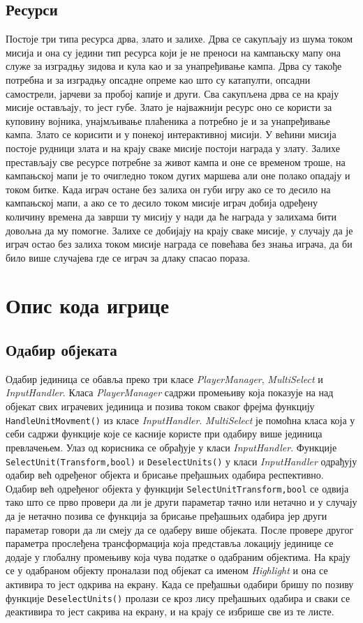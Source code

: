 \documentclass[11pt,a4paper]{report}
\begin{document}
\section{Ресурси}
Постоје три типа ресурса дрва, злато и залихе. Дрва се сакупљају из шума током мисија и она су једини тип ресурса који је не преноси на кампањску мапу она служе за изградњу зидова и кула као и за унапређивање кампа. Дрва су такође потребна и за изградњу опсадне опреме као што су катапулти, опсадни самострели, јарчеви за пробој капије и други. Сва сакупљена дрва се на крају мисије остављају, то јест губе. Злато је најважнији ресурс оно се користи за куповину војника, унајмљивање плаћеника а потребно је и за унапређивање кампа. Злато се корисити и у понекој интерактивној мисији. У већини мисија постоје рудници злата и на крају сваке мисије постоји награда у злату. Залихе престављају све ресурсе потребне за живот кампа и оне се временом троше, на кампањској мапи је то очигледно током дугих маршева али оне полако опадају и током битке. Када играч остане без залиха он губи игру ако се то десило на кампањској мапи, а ако се то десило током мисије играч добија одређену количину времена да заврши ту мисију у нади да ће награда у залихама бити довољна да му помогне. Залихе се добијају на крају сваке мисије, у случају да је играч остао без залиха током мисије награда се повећава без знања играча, да би било више случајева где се играч за длаку спасао пораза.

\chapter{Опис кода игрице}

\section{Одабир објеката}
Одабир јединица се обавља преко три класе \emph{PlayerManager}, \emph{MultiSelect} и \emph{InputHandler}. Класа \emph{PlayerManager} садржи промењиву која показује на над објекат свих играчевих јединица и позива током сваког фрејма  функцију \texttt{HandleUnitMovment()} из класе \emph{InputHandler}. \emph{MultiSelect} је помоћна класа која у себи садржи функције које се касније користе при одабиру више јединица превлачењем. Улаз од корисника се обрађује у класи \emph{InputHandler}. Функције \texttt{SelectUnit(Transform,bool)} и \texttt{DeselectUnits()} у класи \emph{InputHandler} одрађују одабир већ одређеног објекта и брисање пређашњих одабира респективно. Одабир већ одређеног објекта у функцији \texttt{SelectUnit{Transform,bool}} се одвија тако што се прво провери да ли је други параметар тачно или нетачно и у случају да је нетачно позива се функција за брисање пређашњих одабира јер други параметар говори да ли смеју да се одаберу више објеката. После провере другог параметра прослеђена трансформација која представља локацију јединице се додаје у глобалну промењиву која чува податке о одабраним објектима. На крају се у одабраном објекту проналази под објекат са именом \emph{Highlight} и она се активира то јест одкрива на екрану. Када се пређашњи одабири бришу по позиву функције \texttt{DeselectUnits()} пролази се кроз лису пређашњих одабира и сваки се деактивира то јест сакрива на екрану, и на крају се избрише све из те листе. 
\end{document}
